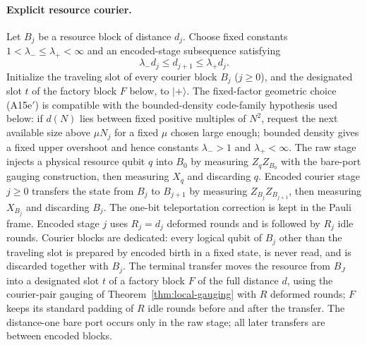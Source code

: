 \documentclass[aps,prx,reprint,superscriptaddress,nofootinbib,floatfix,longbibliography]{revtex4-2}
\theoremstyle{definition}
\begin{document}
\paragraph{Explicit resource courier.}
Let $B_j$ be a resource block of distance $d_j$.  Choose fixed constants
$1<\lambda_-\le\lambda_+<\infty$ and an encoded-stage subsequence satisfying
\begin{equation}
 \lambda_- d_j\le d_{j+1}\le\lambda_+ d_j.                       \tag{A15e$'$}
\end{equation}
Initialize the traveling slot of every courier block $B_j$ ($j\geq0$), and the designated slot $t$ of the factory block $F$ below, to $|+\rangle$.  The fixed-factor
geometric choice (A15e$'$) is compatible with the bounded-density code-family hypothesis
used below: if $d(N)$ lies between fixed positive multiples of $N^2$, request
the next available size above $\mu N_j$ for a fixed $\mu$ chosen large enough;
bounded density gives a fixed upper overshoot and hence constants
$\lambda_->1$ and $\lambda_+<\infty$.  The raw stage injects a physical resource qubit $q$ into $B_0$
by measuring $Z_qZ_{B_0}$ with the bare-port gauging construction, then
measuring $X_q$ and discarding $q$.  Encoded courier stage $j\geq0$ transfers
the state from $B_j$ to $B_{j+1}$ by measuring
$Z_{B_j}Z_{B_{j+1}}$, then measuring $X_{B_j}$ and discarding $B_j$.  The
one-bit teleportation correction is kept in the Pauli frame.  Encoded stage
$j$ uses $R_j=d_j$ deformed rounds and is followed by $R_j$ idle rounds.  Courier blocks
are dedicated: every logical qubit of $B_j$ other than the traveling slot is
prepared by encoded birth in a fixed state, is never read, and is discarded
together with $B_j$.  The terminal transfer moves the resource from $B_J$ into
a designated slot $t$ of a factory block $F$ of the full distance $d$, using
the courier-pair gauging of Theorem~\ref{thm:local-gauging} with $R$
deformed rounds; $F$ keeps its standard padding of $R$ idle rounds before and
after the transfer.
The distance-one bare port occurs only in the raw stage; all later transfers
are between encoded blocks.
\end{document}
